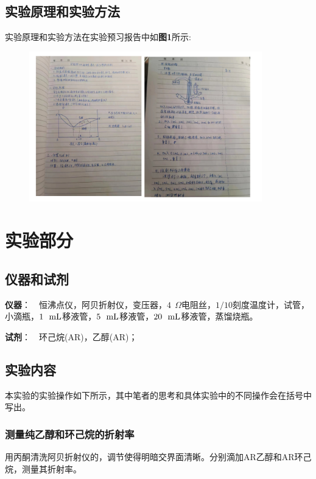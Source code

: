 \documentclass[12pt]{article}
\begin{document}
			\subsection{实验原理和实验方法}
				实验原理和实验方法在实验预习报告中如\textbf{图1}所示: \par
		\begin{figure}[h]
			\centering
			\includegraphics[width=0.9\textwidth]{1.png}
		\end{figure}

	     
    \section{实验部分}

    	\subsection{仪器和试剂}
    		\textbf{仪器}：\ \  恒沸点仪，阿贝折射仪，变压器，$4\ \ \Omega$电阻丝，$1/10$刻度温度计，试管，小滴瓶，$1\ \ {\rm mL}$移液管，$5\ \ {\rm mL}$移液管，$20\ \ {\rm mL}$移液管，蒸馏烧瓶。\par
			\textbf{试剂}：\ \  环己烷(AR)，乙醇(AR)；

    	\subsection{实验内容\citealp{physchemlab}}
			本实验的实验操作如下所示，其中笔者的思考和具体实验中的不同操作会在括号中写出。\par
			\subsubsection{测量纯乙醇和环己烷的折射率}
				用丙酮清洗阿贝折射仪的，调节使得明暗交界面清晰。分别滴加AR乙醇和AR环己烷，测量其折射率。 \par
\end{document}
